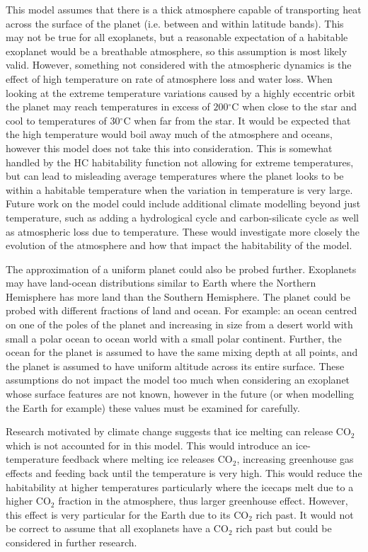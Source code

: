 \documentclass[12pt, onecolumn]{revtex4-2}    %
\newcommand{\degreesC}{\ensuremath{^{\circ}\text{C}}}
\begin{document}
This model assumes that there is a thick atmosphere capable of transporting heat across the surface of the planet (i.e. between and within latitude bands).
This may not be true for all exoplanets, but a reasonable expectation of a habitable exoplanet would be a breathable atmosphere, so this assumption is most likely valid.
However, something not considered with the atmospheric dynamics is the effect of high temperature on rate of atmosphere loss and water loss.
When looking at the extreme temperature variations caused by a highly eccentric orbit the planet may reach temperatures in excess of $200\degreesC$ when close to the star and cool to temperatures of $30\degreesC$ when far from the star.
It would be expected that the high temperature would boil away much of the atmosphere and oceans, however this model does not take this into consideration.
This is somewhat handled by the HC habitability function not allowing for extreme temperatures, but can lead to misleading average temperatures where the planet looks to be within a habitable temperature when the variation in temperature is very large.
Future work on the model could include additional climate modelling beyond just temperature, such as adding a hydrological cycle and carbon-silicate cycle as well as atmospheric loss due to temperature.
These would investigate more closely the evolution of the atmosphere and how that impact the habitability of the model.

The approximation of a uniform planet could also be probed further.
Exoplanets may have land-ocean distributions similar to Earth where the Northern Hemisphere has more land than the Southern Hemisphere.
The planet could be probed with different fractions of land and ocean.
For example: an ocean centred on one of the poles of the planet and increasing in size from a desert world with small a polar ocean to ocean world with a small polar continent.
Further, the ocean for the planet is assumed to have the same mixing depth at all points, and the planet is assumed to have uniform altitude across its entire surface.
These assumptions do not impact the model too much when considering an exoplanet whose surface features are not known, however in the future (or when modelling the Earth for example) these values must be examined for carefully.

Research motivated by climate change suggests that ice melting can release CO$_2$ which is not accounted for in this model.
This would introduce an ice-temperature feedback where melting ice releases CO$_2$, increasing greenhouse gas effects and feeding back until the temperature is very high.
This would reduce the habitability at higher temperatures particularly where the icecaps melt due to a higher CO$_2$ fraction in the atmosphere, thus larger greenhouse effect.
However, this effect is very particular for the Earth due to its CO$_2$ rich past.
It would not be correct to assume that all exoplanets have a CO$_2$ rich past but could be considered in further research.
\end{document}
